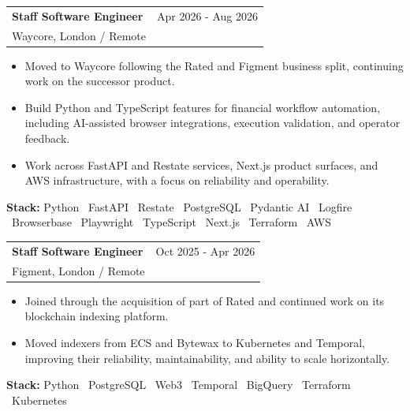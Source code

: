 \documentclass[10pt,a4paper]{article}
\makeatletter
\newcommand{\roleheading}[3]{
  \begin{tabularx}{\textwidth}{@{}Xr@{}}
    {\bfseries\color{Heading} #1} & {\small\color{Muted} #3} \\
    {\small\color{Muted} #2} & \\
  \end{tabularx}
}
\makeatother
\begin{document}
\roleheading{Staff Software Engineer}{Waycore, London / Remote}{Apr 2026 - Aug 2026}
\begin{itemize}

  \item {\small Moved to Waycore following the Rated and Figment business split, continuing work on the successor product.
}

  \item {\small Build Python and TypeScript features for financial workflow automation, including AI-assisted browser integrations, execution validation, and operator feedback.
}

  \item {\small Work across FastAPI and Restate services, Next.js product surfaces, and AWS infrastructure, with a focus on reliability and operability.
}

\end{itemize}
{\small\color{Muted}\textbf{Stack:} Python \textbar\ FastAPI \textbar\ Restate \textbar\ PostgreSQL \textbar\ Pydantic AI \textbar\ Logfire \textbar\ Browserbase \textbar\ Playwright \textbar\ TypeScript \textbar\ Next.js \textbar\ Terraform \textbar\ AWS}\par
\vspace{0.65em}


\roleheading{Staff Software Engineer}{Figment, London / Remote}{Oct 2025 - Apr 2026}
\begin{itemize}

  \item {\small Joined through the acquisition of part of Rated and continued work on its blockchain indexing platform.
}

  \item {\small Moved indexers from ECS and Bytewax to Kubernetes and Temporal, improving their reliability, maintainability, and ability to scale horizontally.
}

\end{itemize}
{\small\color{Muted}\textbf{Stack:} Python \textbar\ PostgreSQL \textbar\ Web3 \textbar\ Temporal \textbar\ BigQuery \textbar\ Terraform \textbar\ Kubernetes}\par
\vspace{0.65em}
\end{document}
